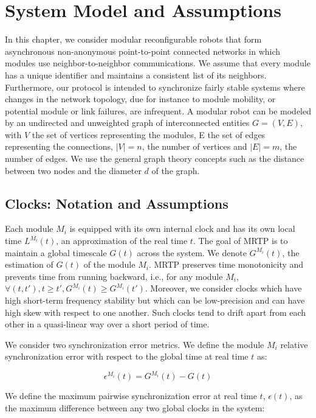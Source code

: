 \section{System Model and Assumptions}
\label{section:time-sync:model}

In this chapter, we consider modular reconfigurable robots that form asynchronous non-anonymous point-to-point connected networks in which modules use neighbor-to-neighbor communications. We assume that every module has a unique identifier and maintains a consistent list of its neighbors. Furthermore, our protocol is intended to synchronize fairly stable systems where changes in the network topology, due for instance to module mobility, or potential module or link failures, are infrequent. A modular robot can be modeled by an undirected and unweighted graph of interconnected entities $G = (V,E)$, with $V$ the set of vertices representing the modules, E the set of edges representing the connections, $|V|=n$, the number of vertices and $|E|= m$, the number of edges. We use the general graph theory concepts such as the distance between two nodes and the diameter $d$ of the graph.

\subsection{Clocks: Notation and Assumptions}

Each module $M_i$ is equipped with its own internal clock and has its own local time $L^{M_i}(t)$, an approximation of the real time $t$. The goal of MRTP is to maintain a global timescale $G(t)$ across the system. We denote $G^{M_i}(t)$, the estimation of $G(t)$ of the module $M_i$. MRTP preserves time monotonicity and prevents time from running backward, i.e., for any module $M_i$, $\forall (t,t'), t \geq t', G^{M_i}(t) \geq G^{M_i}(t')$. Moreover, we consider clocks which have high short-term frequency stability but which can be low-precision and can have high skew with respect to one another. Such clocks tend to drift apart from each other in a quasi-linear way over a short period of time.

We consider two synchronization error metrics. We define the module $M_i$ relative synchronization error with respect to the global time at real time $t$ as:

\begin{equation}
\epsilon^{M_i}(t) = G^{M_i}(t) - G(t)
\end{equation}

We define the maximum pairwise synchronization error at real time $t$, $\epsilon(t)$, as the maximum difference between any two global clocks in the system:

